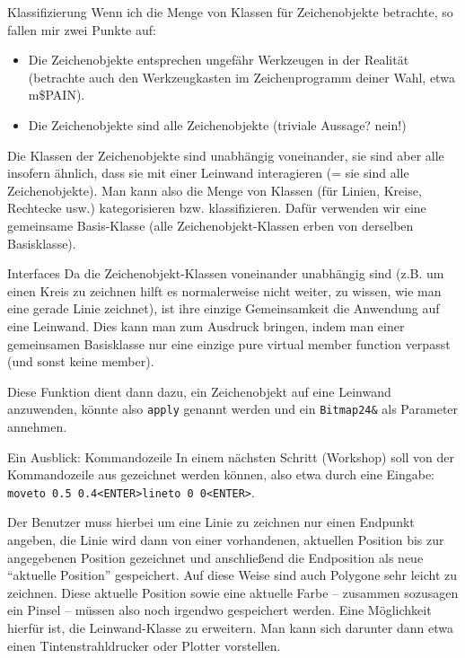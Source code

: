 \begin{frame}{Klassifizierung}
	Wenn ich die Menge von Klassen für Zeichenobjekte betrachte, so fallen mir zwei Punkte auf:
	\begin{itemize}
		\item Die Zeichenobjekte entsprechen ungefähr Werkzeugen in der Realität (betrachte auch den Werkzeugkasten im Zeichenprogramm deiner Wahl, etwa m\$PAIN).
		\item Die Zeichenobjekte sind alle Zeichenobjekte (triviale Aussage? nein!)
	\end{itemize}
	
	\pause
	\vspace{1em}
	
	Die Klassen der Zeichenobjekte sind unabhängig voneinander, sie sind aber alle insofern ähnlich, dass sie mit einer Leinwand interagieren (= sie sind alle Zeichenobjekte). Man kann also die Menge von Klassen (für Linien, Kreise, Rechtecke usw.) kategorisieren bzw. klassifizieren. Dafür verwenden wir eine gemeinsame Basis-Klasse (alle Zeichenobjekt-Klassen erben von derselben Basisklasse).
\end{frame}

\begin{frame}[fragile]{Interfaces}
	Da die Zeichenobjekt-Klassen voneinander unabhängig sind (z.B. um einen Kreis zu zeichnen hilft es normalerweise nicht weiter, zu wissen, wie man eine gerade Linie zeichnet), ist ihre einzige Gemeinsamkeit die Anwendung auf eine Leinwand. Dies kann man zum Ausdruck bringen, indem man einer gemeinsamen Basisklasse nur eine einzige pure virtual member function verpasst (und sonst keine member).
	
	\pause
	\vspace{1em}
	
	Diese Funktion dient dann dazu, ein Zeichenobjekt auf eine Leinwand anzuwenden, könnte also \verb|apply| genannt werden und ein \verb|Bitmap24&| als Parameter annehmen.
\end{frame}

\begin{frame}[fragile]{Ein Ausblick: Kommandozeile}
	In einem nächsten Schritt (Workshop) soll von der Kommandozeile aus gezeichnet werden können, also etwa durch eine Eingabe:
	\verb|moveto 0.5 0.4<ENTER>lineto 0 0<ENTER>|.
	
	\vspace{1em}
	
	Der Benutzer muss hierbei um eine Linie zu zeichnen nur einen Endpunkt angeben, die Linie wird dann von einer vorhandenen, aktuellen Position bis zur angegebenen Position gezeichnet und anschließend die Endposition als neue \enquote{aktuelle Position} gespeichert. Auf diese Weise sind auch Polygone sehr leicht zu zeichnen.
	Diese aktuelle Position sowie eine aktuelle Farbe -- zusammen sozusagen ein Pinsel -- müssen also noch irgendwo gespeichert werden. Eine Möglichkeit hierfür ist, die Leinwand-Klasse zu erweitern. Man kann sich darunter dann etwa einen Tintenstrahldrucker oder Plotter vorstellen.
\end{frame}

